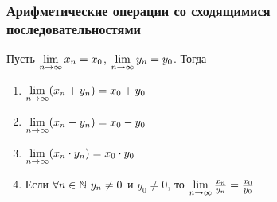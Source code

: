 \subsubsection*{Арифметические операции со сходящимися последовательностями}

Пусть $\lim\limits_{n \to \infty} x_n = x_0$, $\lim\limits_{n \to \infty} y_n = y_0$. Тогда

\begin{enumerate}
	\item $\lim\limits_{n \to \infty} (x_n + y_n) = x_0 + y_0$
	\item $\lim\limits_{n \to \infty} (x_n - y_n) = x_0 - y_0$
	\item $\lim\limits_{n \to \infty} (x_n \cdot y_n) = x_0 \cdot y_0$
	\item Если $\forall n \in \mathbb{N}\ y_n \neq 0$ и $y_0 \neq 0$, то $\lim\limits_{n \to \infty} \frac{x_n}{y_n} = \frac{x_0}{y_0}$
\end{enumerate}


